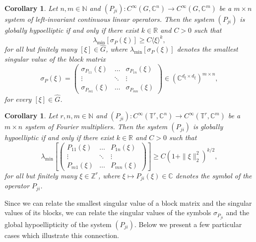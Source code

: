 \documentclass[11pt]{amsart}
\numberwithin{theorem}{section}
\numberwithin{equation}{section}
\newtheorem{corollary}[theorem]{Corollary}
\theoremstyle{definition}
\numberwithin{example}{section}
\theoremstyle{definition}
\theoremstyle{definition}
\newcommand{\R}{\mathbb{R}}
\newcommand{\Z}{\mathbb{Z}}
\newcommand{\N}{\mathbb{N}}
\newcommand{\T}{\mathbb{T}}
\begin{document}
\begin{corollary}\label{theo-systems}
    Let  $n,m\in\N$ and $(P_{ji}):C^\infty(G,\mathbb{C}^n)\to C^\infty(G,\mathbb{C}^m)$ be a $m \times n$ system of left-invariant continuous linear operators.  Then the system $(P_{ji})$ is globally hypoelliptic if and only if there exist $k\in\R$ and $C>0$ such that
    \begin{equation*}
        \lambda_{\min}[\sigma_P(\xi)]\geq C\langle\xi\rangle^k,
    \end{equation*}
    for all but finitely many $[\xi]\in\widehat{G}$, where $\lambda_{\min}[\sigma_P(\xi)]$ denotes the smallest singular value of the block matrix 
    \begin{equation*}
    \sigma_P(\xi)=\begin{pmatrix}
        \sigma_{P_{11}}(\xi)&\dots &\sigma_{P_{1n}}(\xi)\\
        \vdots&\ddots&\vdots\\
         \sigma_{P_{m1}}(\xi)&\dots &\sigma_{P_{mn}}(\xi)
    \end{pmatrix}\in (\mathbb{C}^{d_\xi\times d_\xi})^{m\times n},
\end{equation*}
for every $[\xi]\in\widehat{G}$.
\end{corollary}
\begin{corollary}  
    Let $r,n,m\in\N$ and $(P_{ji}):C^\infty(\T^r,\mathbb{C}^n)\to C^\infty(\T^r,\mathbb{C}^m)$ be a $m\times n$ system of Fourier multipliers. Then the system $(P_{ji})$ is globally hypoelliptic if and only if there exist $k\in\R$ and $C>0$ such that
    \begin{equation*}
        \lambda_{\min}\left[\begin{pmatrix}
        {P_{11}}(\xi)&\dots &{P_{1n}}(\xi)\\
        \vdots&\ddots&\vdots\\
         {P_{m1}}(\xi)&\dots &{P_{mn}}(\xi)
    \end{pmatrix}\right]\geq C(1+\|\xi\|_2^2)^{k/2},
    \end{equation*}
    for all but finitely many $\xi\in\Z^r$, where $\xi\mapsto P_{ji}(\xi)\in\mathbb{C}$ denotes the symbol of the operator $P_{ji}$.
\end{corollary}
Since we can relate the smallest singular value of a block matrix and the singular values of its blocks, we can relate the singular values of the symbols $\sigma_{P_{ji}}$ and the global hypoellipticity of the system $(P_{ji})$. Below we present a few particular cases which illustrate this connection.
\end{document}
